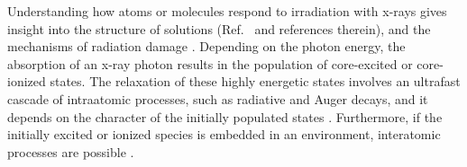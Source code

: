 Understanding how atoms or molecules respond to irradiation with x-rays gives insight into the structure of solutions (Ref.\ \citep{smith17:13909} and references therein), and the mechanisms of radiation damage \citep{ONeill02:329,Carugo05:213,Stumpf16:237}. Depending on the photon energy, the absorption of an x-ray photon results in the population of core-excited or core-ionized states. The relaxation of these highly energetic states involves an ultrafast cascade of intraatomic processes, such as radiative and Auger decays, and it depends on the character of the initially populated states \citep{stoychev08:074307,Demekhin08:043421,Demekhin09:104303,Ouchi11:053415,Miteva14:164303,travnikova16:213001,Gokhberg14:661,Trinter14:664}. Furthermore, if the initially excited or ionized species is embedded in an environment, interatomic processes are possible  \citep{Pokapanich09:7264,Pokapanich11:13430,Stumpf16:237,unger17:708,ceolin17:263003}.



